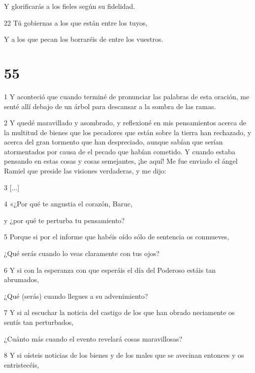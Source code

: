 Y glorificarás a los fieles según su fidelidad.

\par 22 Tú gobiernas a los que están entre los tuyos,

Y a los que pecan los borraréis de entre los vuestros.

\chapter{55}

\par 1 Y aconteció que cuando terminé de pronunciar las palabras de esta oración, me senté allí debajo de un árbol para descansar a la sombra de las ramas.

\par 2 Y quedé maravillado y asombrado, y reflexioné en mis pensamientos acerca de la multitud de bienes que los pecadores que están sobre la tierra han rechazado, y acerca del gran tormento que han despreciado, aunque sabían que serían atormentados por causa de el pecado que habían cometido. Y cuando estaba pensando en estas cosas y cosas semejantes, ¡he aquí! Me fue enviado el ángel Ramiel que preside las visiones verdaderas, y me dijo:

\par 3 [...]

\par 4 «¿Por qué te angustia el corazón, Baruc,

\par y ¿por qué te perturba tu pensamiento?

\par 5 Porque si por el informe que habéis oído sólo de sentencia os conmueves,

¿Qué serás cuando lo veas claramente con tus ojos?

\par 6 Y si con la esperanza con que esperáis el día del Poderoso estáis tan abrumados,

\par ¿Qué (serás) cuando llegues a su advenimiento?

\par 7 Y si al escuchar la noticia del castigo de los que han obrado neciamente os sentís tan perturbados,

\par ¿Cuánto más cuando el evento revelará cosas maravillosas?

\par 8 Y si oísteis noticias de los bienes y de los males que se avecinan entonces y os entristecéis,

